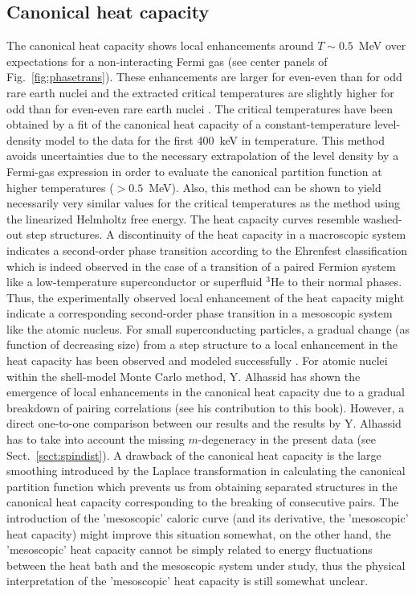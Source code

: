 \documentclass[sort&compress,final,numberedheadings]{aipproc}
\begin{document}
\subsection{Canonical heat capacity}

The canonical heat capacity shows local enhancements around $T\sim 0.5$~MeV 
over expectations for a non-interacting Fermi gas (see center panels of Fig.\ 
\ref{fig:phasetrans}). These enhancements are larger for even-even than for odd
rare earth nuclei and the extracted critical temperatures are slightly higher 
for odd than for even-even rare earth nuclei \cite{SB01}. The critical 
temperatures have been obtained by a fit of the canonical heat capacity of a 
constant-temperature level-density model to the data for the first 400~keV in 
temperature. This method avoids uncertainties due to the necessary 
extrapolation of the level density by a Fermi-gas expression in order to 
evaluate the canonical partition function at higher temperatures ($>0.5$~MeV). 
Also, this method can be shown to yield necessarily very similar values for the
critical temperatures \cite{GC03} as the method using the linearized Helmholtz 
free energy. The heat capacity curves resemble washed-out step structures. A 
discontinuity of the heat capacity in a macroscopic system indicates a 
second-order phase transition according to the Ehrenfest classification which 
is indeed observed in the case of a transition of a paired Fermion system like 
a low-temperature superconductor or superfluid $^3$He to their normal phases. 
Thus, the experimentally observed local enhancement of the heat capacity might 
indicate a corresponding second-order phase transition in a mesoscopic system 
like the atomic nucleus. For small superconducting particles, a gradual change 
(as function of decreasing size) from a step structure to a local enhancement 
in the heat capacity has been observed and modeled successfully \cite{LA93}. 
For atomic nuclei within the shell-model Monte Carlo method, Y. Alhassid has 
shown the emergence of local enhancements in the canonical heat capacity due to
a gradual breakdown of pairing correlations (see his contribution to this 
book). However, a direct one-to-one comparison between our results and the 
results by Y. Alhassid has to take into account the missing $m$-degeneracy in 
the present data (see Sect.\ \ref{sect:spindist}). A drawback of the canonical 
heat capacity is the large smoothing introduced by the Laplace transformation 
in calculating the canonical partition function which prevents us from 
obtaining separated structures in the canonical heat capacity corresponding to 
the breaking of consecutive pairs. The introduction of the 'mesoscopic' caloric
curve (and its derivative, the 'mesoscopic' heat capacity) might improve this 
situation somewhat, on the other hand, the 'mesoscopic' heat capacity cannot be
simply related to energy fluctuations between the heat bath and the mesoscopic 
system under study, thus the physical interpretation of the 'mesoscopic' heat 
capacity is still somewhat unclear.
\end{document}
